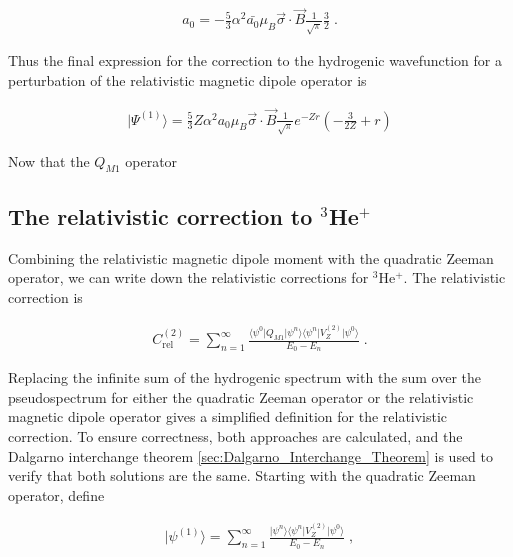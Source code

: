             \begin{align}
                a_0 = -\frac{5}{3} \alpha^2 \bar{a_0} \mu_B \vec{\sigma} \cdot \vec{B} \frac{1}{\sqrt{\pi}} \frac{3}{2}\;.
            \end{align}

            \noindent Thus the final expression for the correction to the hydrogenic wavefunction for a perturbation of the relativistic magnetic dipole operator is 

            \begin{align}
                \vert \varPsi^{(1)} \rangle = \frac{5}{3} Z \alpha^2 a_0 \mu_B \vec{\sigma} \cdot \vec{B} \frac{1}{\sqrt{\pi}} e^{-Zr} \left( - \frac{3}{2Z} + r \right)
            \end{align}

            \noindent Now that the $Q_{M1}$ operator 

        \subsection{The relativistic correction to $^3$He$^+$}\label{sec:Relativistic_Correction}
            Combining the relativistic magnetic dipole moment with the quadratic Zeeman operator, we can write down the relativistic corrections for $^3$He$^+$. The relativistic correction is

            \begin{align}
                C_{\text{rel}}^{(2)} = \sum_{n = 1}^\infty \frac{\langle \psi^0 \vert Q_{M1} \vert \psi^n \rangle \langle \psi^n\vert V_Z^{(2)} \vert \psi^0 \rangle}{E_0 - E_n}\;.
            \end{align}

            \noindent Replacing the infinite sum of the hydrogenic spectrum with the sum over the pseudospectrum for either the quadratic Zeeman operator or the relativistic magnetic dipole operator gives a simplified definition for the relativistic correction. To ensure correctness, both approaches are calculated, and the Dalgarno interchange theorem \ref{sec:Dalgarno_Interchange_Theorem} is used to verify that both solutions are the same. Starting with the quadratic Zeeman operator, define 

            \begin{align}
                \vert \psi^{(1)} \rangle = \sum_{n = 1}^\infty \frac{\vert \psi^n \rangle \langle \psi^n \vert V_Z^{(2)} \vert \psi^0 \rangle}{E_0 - E_n}\;,
            \end{align}

